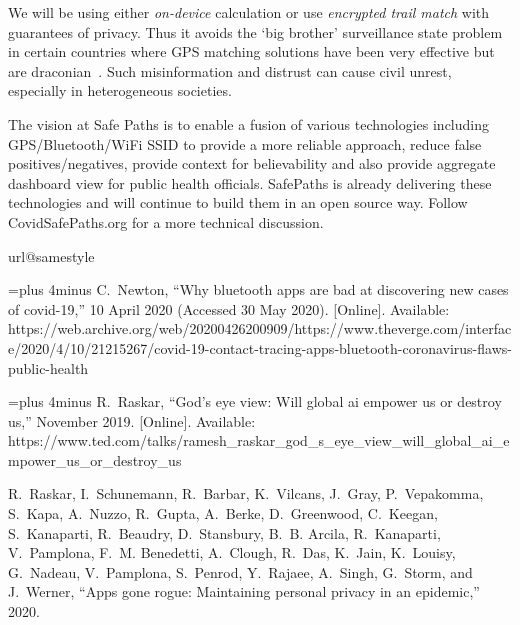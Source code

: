 \documentclass[11pt]{article}
\begin{document}
We will be using either \emph{on-device} calculation or use \emph{encrypted trail match} with guarantees of privacy. Thus it avoids the ‘big brother’ surveillance state problem in certain countries where GPS matching solutions have been very effective but are draconian~\cite{ramesh2}. Such misinformation and distrust can cause civil unrest, especially in heterogeneous societies.


The vision at Safe Paths is to  enable a fusion of various technologies including GPS/Bluetooth/WiFi SSID to provide a more reliable approach, reduce false positives/negatives, provide context for believability and also provide aggregate dashboard view for public health officials. SafePaths is already delivering these technologies and will continue to build them in an open source way. Follow CovidSafePaths.org for a more technical discussion.



% 
% 



\begin{thebibliography}{1}
\providecommand{\url}[1]{#1}
\csname url@samestyle\endcsname
\providecommand{\newblock}{\relax}
\providecommand{\bibinfo}[2]{#2}
\providecommand{\BIBentrySTDinterwordspacing}{\spaceskip=0pt\relax}
\providecommand{\BIBentryALTinterwordstretchfactor}{4}
\providecommand{\BIBentryALTinterwordspacing}{\spaceskip=\fontdimen2\font plus
\BIBentryALTinterwordstretchfactor\fontdimen3\font minus
  \fontdimen4\font\relax}
\providecommand{\BIBforeignlanguage}[2]{{%
\expandafter\ifx\csname l@#1\endcsname\relax
\typeout{** WARNING: IEEEtran.bst: No hyphenation pattern has been}%
\typeout{** loaded for the language `#1'. Using the pattern for}%
\typeout{** the default language instead.}%
\else
\language=\csname l@#1\endcsname
\fi
#2}}
\providecommand{\BIBdecl}{\relax}
\BIBdecl

\BIBentryALTinterwordspacing
C.~Newton, ``Why bluetooth apps are bad at discovering new cases of covid-19,''
  10 April 2020 (Accessed 30 May 2020). [Online]. Available:
  \url{https://web.archive.org/web/20200426200909/https://www.theverge.com/interface/2020/4/10/21215267/covid-19-contact-tracing-apps-bluetooth-coronavirus-flaws-public-health}
\BIBentrySTDinterwordspacing

\BIBentryALTinterwordspacing
R.~Raskar, ``God's eye view: Will global ai empower us or destroy us,''
  November 2019. [Online]. Available:
  \url{https://www.ted.com/talks/ramesh_raskar_god_s_eye_view_will_global_ai_empower_us_or_destroy_us}
\BIBentrySTDinterwordspacing

R.~Raskar, I.~Schunemann, R.~Barbar, K.~Vilcans, J.~Gray, P.~Vepakomma,
  S.~Kapa, A.~Nuzzo, R.~Gupta, A.~Berke, D.~Greenwood, C.~Keegan, S.~Kanaparti,
  R.~Beaudry, D.~Stansbury, B.~B. Arcila, R.~Kanaparti, V.~Pamplona, F.~M.
  Benedetti, A.~Clough, R.~Das, K.~Jain, K.~Louisy, G.~Nadeau, V.~Pamplona,
  S.~Penrod, Y.~Rajaee, A.~Singh, G.~Storm, and J.~Werner, ``Apps gone rogue:
  Maintaining personal privacy in an epidemic,'' 2020.

\end{thebibliography}
\end{document}
